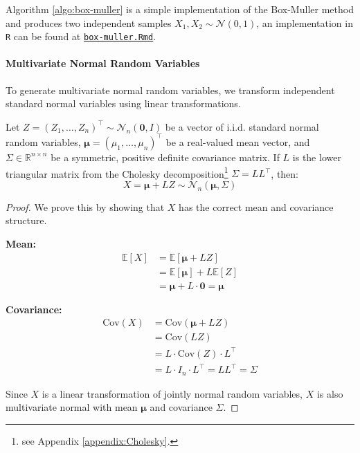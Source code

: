 Algorithm \ref{algo:box-muller} is a simple implementation of the Box-Muller method and produces two independent samples $X_1, X_2 \sim \mathcal{N}(0,1)$, an implementation in \texttt{R} can be found at \href{https://github.com/NikoGerman/Seminar/blob/main/Notebooks/box-muller.Rmd}{\texttt{box-muller.Rmd}}.
\paragraph{Multivariate Normal Random Variables}
To generate multivariate normal random variables, we transform independent standard normal variables using linear transformations.

\begin{theoremrep}
\label{thm:multivariate-normal}
Let $Z = (Z_1, \ldots, Z_n)^\top \sim \mathcal{N}_n(\mathbf{0}, I)$ be a vector of i.i.d. standard normal random variables, $\boldsymbol{\mu} = (\mu_1, \ldots, \mu_n)^\top$ be a real-valued mean vector, and $\Sigma \in \mathbb{R}^{n\times n}$ be a symmetric, positive definite covariance matrix. If $L$ is the lower triangular matrix from the Cholesky decomposition\footnote{see Appendix \ref{appendix:Cholesky}.} $\Sigma = LL^\top$, then:
\begin{equation}
    X = \boldsymbol{\mu} + LZ \sim \mathcal{N}_n(\boldsymbol{\mu}, \Sigma)
\end{equation}

\end{theoremrep}

\begin{proof}
We prove this by showing that $X$ has the correct mean and covariance structure.

\textbf{Mean:}
\begin{align*}
\mathbb{E}[X] &= \mathbb{E}[\boldsymbol{\mu} + LZ] \\
&= \mathbb{E}[\boldsymbol{\mu}] + L\mathbb{E}[Z] \\
&= \boldsymbol{\mu} + L \cdot \mathbf{0} = \boldsymbol{\mu}
\end{align*}

\textbf{Covariance:}
\begin{align*}
\text{Cov}(X) &= \text{Cov}(\boldsymbol{\mu} + LZ) \\
&= \text{Cov}(LZ) \\
&= L \cdot \text{Cov}(Z) \cdot L^\top \\
&= L \cdot I_n \cdot L^\top = LL^\top = \Sigma
\end{align*}

Since $X$ is a linear transformation of jointly normal random variables, $X$ is also multivariate normal with mean $\boldsymbol{\mu}$ and covariance $\Sigma$.
\end{proof}

